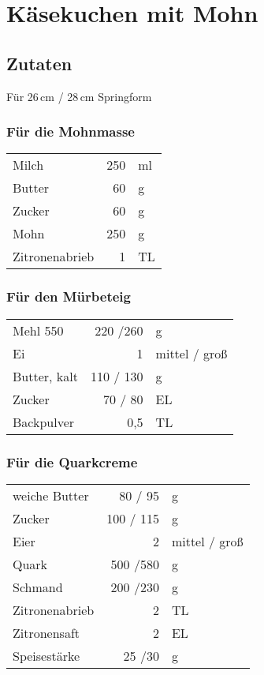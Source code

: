 \section{Käsekuchen mit Mohn} 
\subsection*{Zutaten}
Für 26\,cm / 28\,cm Springform 

\subsubsection*{Für die Mohnmasse}
\begin{tabular}{lrl}
    Milch          & 250 & ml \\
    Butter         &  60 &  g \\
    Zucker         &  60 &  g \\
    Mohn           & 250 &  g \\
    Zitronenabrieb &   1 & TL
\end{tabular} 
\subsubsection*{Für den Mürbeteig}
\begin{tabular}{lrl}
    Mehl 550     &  220 /260 &             g \\
    Ei           &         1 & mittel / groß \\
    Butter, kalt & 110 / 130 &             g \\
    Zucker       &   70 / 80 &            EL \\
    Backpulver   &       0,5 &            TL
\end{tabular} 

\subsubsection*{Für die Quarkcreme}
\begin{tabular}{lrl}
    weiche Butter  &   80 / 95 &             g \\
    Zucker         & 100 / 115 &             g \\
    Eier           &         2 & mittel / groß \\
    Quark          &  500 /580 &             g \\
    Schmand        & 200  /230 &             g \\
    Zitronenabrieb &         2 &            TL \\
    Zitronensaft   &         2 &            EL \\
    Speisestärke   &    25 /30 &             g
\end{tabular} 

